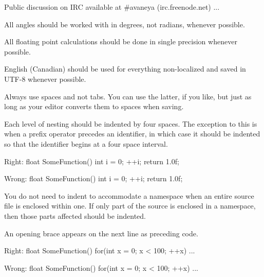     Public discussion on IRC available at #avaneya (irc.freenode.net)
    ...
\stoptyping
\StopCodeExample


\startitemize[3]
\setupwhitespace[big]
\item
All angles should be worked with in degrees, not radians, whenever possible.

\item
All floating point calculations should be done in single precision whenever possible.
\stopitemize


\startitemize[3]
\setupwhitespace[big]
\item
English (Canadian) should be used for everything non-localized and saved in UTF-8 whenever possible.

\item
Always use spaces and not tabs. You can use the latter, if you like, but just as long as your editor converts them to spaces when saving.

\item
Each level of nesting should be indented by four spaces. The exception to this is when a prefix operator precedes an identifier, in which case it should be indented so that the identifier begins at a four space interval.

Right:
\StartCodeExample
\starttyping
float SomeFunction()
{
    int i = 0;
  ++i;
    return 1.0f;
}
\stoptyping
\StopCodeExample

Wrong:
\StartCodeExample
\starttyping
float SomeFunction()
{
    int i = 0;
    ++i;
        return 1.0f;
}
\stoptyping
\StopCodeExample

\item
You do not need to indent to accommodate a namespace when an entire source file is enclosed within one. If only part of the source is enclosed in a namespace, then those parts affected should be indented.

\item
An opening brace appears on the next line as preceding code.

Right:
\StartCodeExample
\starttyping
float SomeFunction()
{
    for(int x = 0; x < 100; ++x)
    {
        ...
    }
}
\stoptyping
\StopCodeExample

Wrong:
\StartCodeExample
\starttyping
float SomeFunction() {
    for(int x = 0; x < 100; ++x) {
        ...
    }
}
\stoptyping
\StopCodeExample

